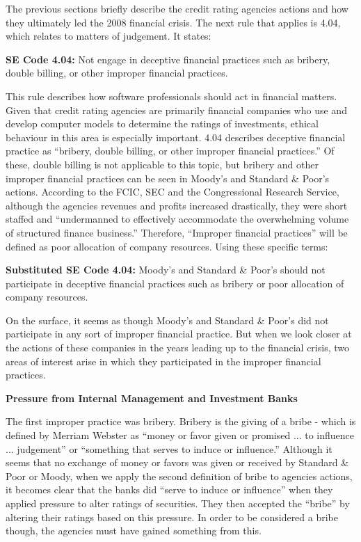 \documentclass[11pt]{article}
\begin{document}
\begin{multicols}{2}
The previous sections briefly describe the credit rating agencies actions and how they ultimately led the 2008 financial crisis.  The next rule that applies is 4.04, which relates to matters of judgement.  It states:


\begin{framed}
\noindent
   \textbf{SE Code 4.04: } 
   \newline
   [Do] Not engage in deceptive financial practices such as bribery, double billing, or other improper financial practices.
\end{framed}


This rule describes how software professionals should act in financial matters.  Given that credit rating agencies are primarily financial companies who use and develop computer models to determine the ratings of investments, ethical behaviour in this area is especially important.  
4.04 describes deceptive financial practice as ``bribery, double billing, or other improper financial practices.''  Of these, double billing is not applicable to this topic, but bribery and other improper financial practices can be seen in Moody's and Standard \& Poor's actions.  According to the FCIC, SEC and the Congressional Research Service, although the agencies revenues and profits increased drastically, they were short staffed and ``undermanned to effectively accommodate the overwhelming volume of structured finance business.'' \cite[pg. 7]{CRS, govtReport, secCRAreport} Therefore, ``Improper financial practices'' will be defined as poor allocation of company resources.  
Using these specific terms:


\begin{framed}
\noindent
   \textbf{Substituted SE Code 4.04: } 
   \newline
   Moody's and Standard \& Poor's should not participate in deceptive financial practices such as bribery or poor allocation of company resources.
\end{framed}


On the surface, it seems as though Moody's and Standard \& Poor's did not participate in any sort of improper financial practice.  But when we look closer at the actions of these companies in the years leading up to the financial crisis, two areas of interest arise in which they participated in the improper financial practices.  

\textbf{Pressure from Internal Management and Investment Banks}

The first improper practice was bribery.  Bribery is the giving of a bribe - which is defined by Merriam Webster as ``money or favor given or promised ... to influence ... judgement'' or ``something that serves to induce or influence.'' \cite{bribeDef}  Although it seems that no exchange of money or favors was given or received by Standard \& Poor or Moody, when we apply the second definition of bribe to agencies actions, it becomes clear that the banks did ``serve to induce or influence'' when they applied pressure to alter ratings of securities.  They then accepted the ``bribe'' by altering their ratings based on this pressure.  In order to be considered a bribe though, the agencies must have gained something from this.


\end{multicols}
\end{document}
